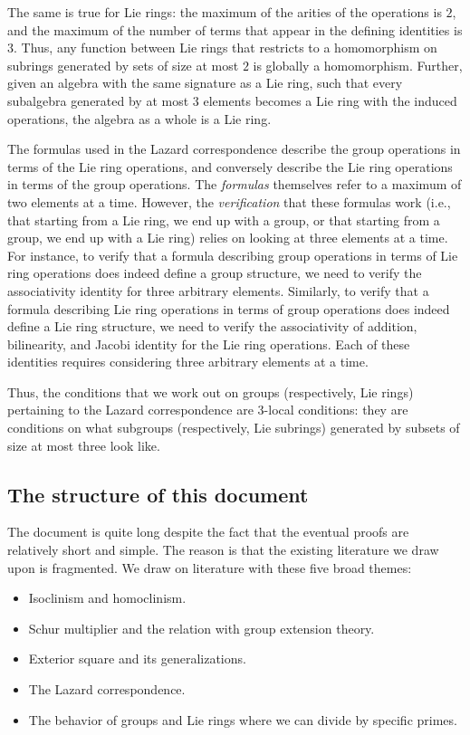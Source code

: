 The same is true for Lie rings: the maximum of the arities of the
operations is $2$, and the maximum of the number of terms that appear
in the defining identities is $3$. Thus, any function between Lie
rings that restricts to a homomorphism on subrings generated by sets
of size at most $2$ is globally a homomorphism. Further, given an
algebra with the same signature as a Lie ring, such that every
subalgebra generated by at most $3$ elements becomes a Lie ring with
the induced operations, the algebra as a whole is a Lie ring.

The formulas used in the Lazard correspondence describe the group
operations in terms of the Lie ring operations, and conversely
describe the Lie ring operations in terms of the group operations. The
{\em formulas} themselves refer to a maximum of two elements at a
time. However, the {\em verification} that these formulas work (i.e.,
that starting from a Lie ring, we end up with a group, or that
starting from a group, we end up with a Lie ring) relies on looking at
three elements at a time. For instance, to verify that a formula
describing group operations in terms of Lie ring operations does
indeed define a group structure, we need to verify the associativity
identity for three arbitrary elements. Similarly, to verify that a
formula describing Lie ring operations in terms of group operations
does indeed define a Lie ring structure, we need to verify the
associativity of addition, bilinearity, and Jacobi identity for the
Lie ring operations. Each of these identities requires considering
three arbitrary elements at a time.

Thus, the conditions that we work out on groups (respectively, Lie
rings) pertaining to the Lazard correspondence are $3$-local
conditions: they are conditions on what subgroups (respectively, Lie
subrings) generated by subsets of size at most three look like.

\subsection{The structure of this document}

The document is quite long despite the fact that the eventual proofs
are relatively short and simple. The reason is that the existing
literature we draw upon is fragmented. We draw on literature with
these five broad themes:

\begin{itemize}
\item Isoclinism and homoclinism.
\item Schur multiplier and the relation with group extension theory.
\item Exterior square and its generalizations.
\item The Lazard correspondence.
\item The behavior of groups and Lie rings where we can divide by
  specific primes.
\end{itemize}

